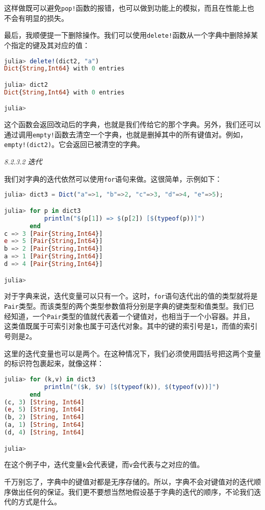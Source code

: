 这样做既可以避免\verb|pop!|函数的报错，也可以做到功能上的模拟，而且在性能上也不会有明显的损失。

最后，我顺便提一下删除操作。我们可以使用\verb|delete!|函数从一个字典中删除掉某个指定的键及其对应的值：
\begin{lstlisting}[language=julia]
julia> delete!(dict2, "a")
Dict{String,Int64} with 0 entries

julia> dict2
Dict{String,Int64} with 0 entries

julia> 
\end{lstlisting}

这个函数会返回改动后的字典，也就是我们传给它的那个字典。另外，我们还可以通过调用\verb|empty!|函数去清空一个字典，也就是删掉其中的所有键值对。例如，\verb|empty!(dict2)|。它会返回已被清空的字典。

\textsl{8.2.3.2 迭代}

我们对字典的迭代依然可以使用\verb|for|语句来做。这很简单，示例如下：
\begin{lstlisting}[language=julia]
julia> dict3 = Dict("a"=>1, "b"=>2, "c"=>3, "d"=>4, "e"=>5);

julia> for p in dict3
           println("$(p[1]) => $(p[2]) [$(typeof(p))]")
       end
c => 3 [Pair{String,Int64}]
e => 5 [Pair{String,Int64}]
b => 2 [Pair{String,Int64}]
a => 1 [Pair{String,Int64}]
d => 4 [Pair{String,Int64}]

julia> 
\end{lstlisting}

对于字典来说，迭代变量可以只有一个。这时，\verb|for|语句迭代出的值的类型就将是\verb|Pair|类型。而该类型的两个类型参数值将分别是字典的键类型和值类型。我们已经知道，一个\verb|Pair|类型的值就代表着一个键值对，也相当于一个小容器。并且，这类值既属于可索引对象也属于可迭代对象。其中的键的索引号是\verb|1|，而值的索引号则是\verb|2|。

这里的迭代变量也可以是两个。在这种情况下，我们必须使用圆括号把这两个变量的标识符包裹起来，就像这样：
\begin{lstlisting}[language=julia]
julia> for (k,v) in dict3
           println("($k, $v) [$(typeof(k)), $(typeof(v))]")
       end
(c, 3) [String, Int64]
(e, 5) [String, Int64]
(b, 2) [String, Int64]
(a, 1) [String, Int64]
(d, 4) [String, Int64]

julia> 
\end{lstlisting}

在这个例子中，迭代变量\verb|k|会代表键，而\verb|v|会代表与之对应的值。

千万别忘了，字典中的键值对都是无序存储的。所以，字典不会对键值对的迭代顺序做出任何的保证。我们更不要想当然地假设基于字典的迭代的顺序，不论我们迭代的方式是什么。

